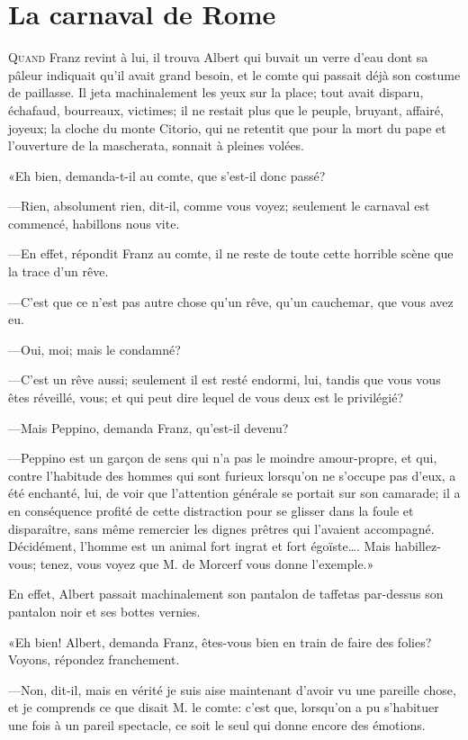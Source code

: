 \chapter{La carnaval de Rome}

\lettrine{Q}{uand} Franz revint à lui, il trouva Albert qui buvait un verre d'eau dont sa pâleur indiquait qu'il avait grand besoin, et le comte qui passait déjà son costume de paillasse. Il jeta machinalement les yeux sur la place; tout avait disparu, échafaud, bourreaux, victimes; il ne restait plus que le peuple, bruyant, affairé, joyeux; la cloche du monte Citorio, qui ne retentit que pour la mort du pape et l'ouverture de la mascherata, sonnait à pleines volées. 

«Eh bien, demanda-t-il au comte, que s'est-il donc passé? 

—Rien, absolument rien, dit-il, comme vous voyez; seulement le carnaval est commencé, habillons nous vite. 

—En effet, répondit Franz au comte, il ne reste de toute cette horrible scène que la trace d'un rêve. 

—C'est que ce n'est pas autre chose qu'un rêve, qu'un cauchemar, que vous avez eu. 

—Oui, moi; mais le condamné? 

—C'est un rêve aussi; seulement il est resté endormi, lui, tandis que vous vous êtes réveillé, vous; et qui peut dire lequel de vous deux est le privilégié? 

—Mais Peppino, demanda Franz, qu'est-il devenu? 

—Peppino est un garçon de sens qui n'a pas le moindre amour-propre, et qui, contre l'habitude des hommes qui sont furieux lorsqu'on ne s'occupe pas d'eux, a été enchanté, lui, de voir que l'attention générale se portait sur son camarade; il a en conséquence profité de cette distraction pour se glisser dans la foule et disparaître, sans même remercier les dignes prêtres qui l'avaient accompagné. Décidément, l'homme est un animal fort ingrat et fort égoïste\dots. Mais habillez-vous; tenez, vous voyez que M. de Morcerf vous donne l'exemple.» 

En effet, Albert passait machinalement son pantalon de taffetas par-dessus son pantalon noir et ses bottes vernies. 

«Eh bien! Albert, demanda Franz, êtes-vous bien en train de faire des folies? Voyons, répondez franchement. 

—Non, dit-il, mais en vérité je suis aise maintenant d'avoir vu une pareille chose, et je comprends ce que disait M. le comte: c'est que, lorsqu'on a pu s'habituer une fois à un pareil spectacle, ce soit le seul qui donne encore des émotions. 

